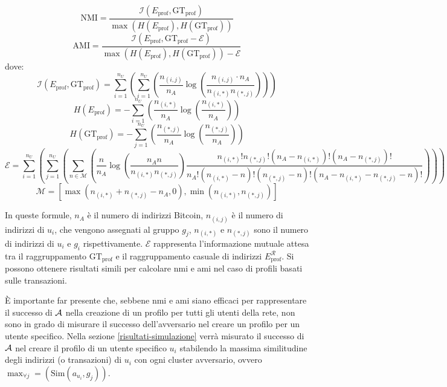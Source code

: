 \[\text{NMI} = \frac{\mathcal{I} \left(E_\text{prof}, \text{GT}_\text{prof}\right)}{\max \left(H \left(E_\text{prof}\right),H \left(\text{GT}_\text{prof}\right)\right)} \]
\[\text{AMI} = \frac{\mathcal{I} \left(E_\text{prof}, \text{GT}_\text{prof} - \mathcal{E}\right)}{\max \left(H \left(E_\text{prof}\right),H \left(\text{GT}_\text{prof}\right)\right) - \mathcal{E}}\]
dove:
\[ \mathcal{I} \left(E_\text{prof}, \text{GT}_\text{prof}\right) = \sum^{n_U}_{i=1} \left( \sum^{n_U}_{i=1} \left( \frac{n_{\left(i,j \right)}}{n_A} \log\left(\frac{n_{\left(i,j\right)} \cdot n_A}{n_{\left(i,*\right)}n_{\left(*,j\right)}}\right)\right)\right) \]
\[ H\left(E_\text{prof}\right) = - \sum^{n_U}_{i=1} \left(\frac{n_{\left(i,*\right)}}{n_A} \log\left(\frac{n_{\left(i,*\right)}}{n_A}\right)\right) \]
\[ H\left(\text{GT}_\text{prof}\right) = - \sum^{n_U}_{j=1} \left(\frac{n_{\left(*,j\right)}}{n_A} \log\left(\frac{n_{\left(*,j\right)}}{n_A}\right)\right) \]
\[
	\scriptstyle \mathcal{E} = \sum^{n_U}_{i=1} \left(
	    \sum^{n_U}_{j=1} \left(
	        \sum_{n \in \mathcal{M}} \left(
	            \frac{n}{n_A} \log \left(
	                \frac{n_A n}{n_{\left(i, *\right)} n_{\left(*, j \right)}}
	            \right) \frac{n_{\left(i, *\right)}! n_{\left(*, j\right)}! \left(
	                n_A - n_{\left(i, *\right)}
	            \right)!\left(
	                n_A - n_{\left(*, j\right)}
	            \right)!}
	            {n_A!\left(n_{\left(i, *\right)} - n\right)!
	                    \left(n_{\left(*, j\right)} - n\right)!
	                    \left(n_A - n_{\left(i, *\right)} - n_{\left(*, j\right)} - n \right)!}
	            \right)
	        \right)
	    \right)
\]
\[ \mathcal{M} = \left[ \max \left( n_{\left(i,*\right)} + n_{\left(*,j\right)} - n_A, 0\right), \min\left(n_{\left(i,*\right)}, n_{\left(*,j\right)}\right)\right] \]

In queste formule, $n_A$ è il numero di indirizzi Bitcoin, $n_{\left(i,j\right)}$ è il numero di indirizzi di $u_i$, che vengono assegnati al gruppo $g_j$, $n_{\left(i,*\right)}$ e $n_{\left(*,j\right)}$ sono il numero di indirizzi di $u_i$ e $g_i$ rispettivamente. $\mathcal{E}$ rappresenta l'informazione mutuale attesa tra il raggruppamento $\text{GT}_\text{prof}$ e il raggruppamento casuale di indirizzi $E^\mathcal{R}_\text{prof}$.
Si possono ottenere risultati simili per calcolare \gls{nmi} e \gls{ami} nel caso di profili basati sulle transazioni.

È importante far presente che, sebbene \gls{nmi} e \gls{ami} siano efficaci per rappresentare il successo di $\mathcal{A}$ nella creazione di un profilo per tutti gli utenti della rete, non sono in grado di misurare il successo dell'avversario nel creare un profilo per un utente specifico.
Nella sezione \ref{risultati-simulazione} verrà misurato il successo di $\mathcal{A}$ nel creare il profilo di un utente specifico $u_i$ stabilendo la massima similitudine degli indirizzi (o transazioni) di $u_i$ con ogni cluster avversario, ovvero $ \max_{\forall j} = \left( \text{Sim}\left(a_{u_i}, g_j\right)\right)$.

